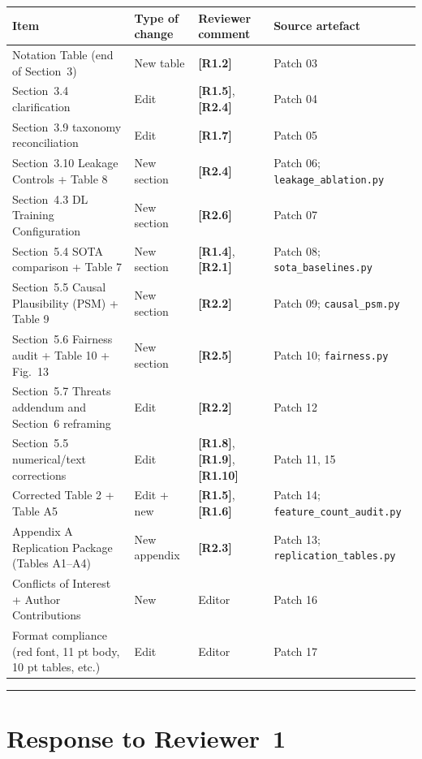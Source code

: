 \documentclass[11pt,a4paper]{article}
\newcommand{\cid}[1]{\textcolor{revred}{\textbf{[#1]}}}
\newcommand{\filebox}[1]{\texttt{\small #1}}
\newcommand{\sectref}[1]{Section~#1}
\begin{document}
\begin{small}
\begin{longtable}{p{2.4cm} p{4.6cm} p{3.6cm} p{4.4cm}}
\toprule
\textbf{Item} & \textbf{Type of change} & \textbf{Reviewer comment} & \textbf{Source artefact} \\
\midrule
\endhead
Notation Table (end of \sectref{3}) & New table & \cid{R1.2} & Patch 03 \\
\sectref{3.4} clarification          & Edit & \cid{R1.5}, \cid{R2.4} & Patch 04 \\
\sectref{3.9} taxonomy reconciliation & Edit & \cid{R1.7} & Patch 05 \\
\sectref{3.10} Leakage Controls + Table 8 & New section & \cid{R2.4} & Patch 06; \filebox{leakage\_ablation.py} \\
\sectref{4.3} DL Training Configuration & New section & \cid{R2.6} & Patch 07 \\
\sectref{5.4} SOTA comparison + Table 7 & New section & \cid{R1.4}, \cid{R2.1} & Patch 08; \filebox{sota\_baselines.py} \\
\sectref{5.5} Causal Plausibility (PSM) + Table 9 & New section & \cid{R2.2} & Patch 09; \filebox{causal\_psm.py} \\
\sectref{5.6} Fairness audit + Table 10 + Fig.~13 & New section & \cid{R2.5} & Patch 10; \filebox{fairness.py} \\
\sectref{5.7} Threats addendum and \sectref{6} reframing & Edit & \cid{R2.2} & Patch 12 \\
\sectref{5.5} numerical/text corrections & Edit & \cid{R1.8}, \cid{R1.9}, \cid{R1.10} & Patch 11, 15 \\
Corrected Table 2 + Table A5 & Edit + new & \cid{R1.5}, \cid{R1.6} & Patch 14; \filebox{feature\_count\_audit.py} \\
Appendix A Replication Package (Tables A1--A4) & New appendix & \cid{R2.3} & Patch 13; \filebox{replication\_tables.py} \\
Conflicts of Interest + Author Contributions & New & Editor & Patch 16 \\
Format compliance (red font, 11 pt body, 10 pt tables, etc.) & Edit & Editor & Patch 17 \\
\bottomrule
\end{longtable}
\end{small}

\bigskip
\hrule
\bigskip

\section{Response to Reviewer~1}
\end{document}
